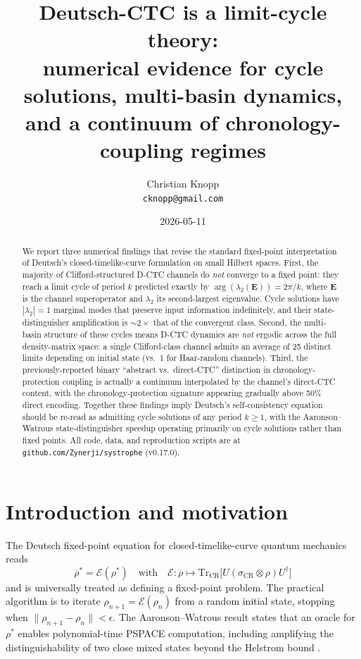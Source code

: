 \documentclass[11pt,a4paper]{article}
\title{\bfseries Deutsch-CTC is a limit-cycle theory: \\
numerical evidence for cycle solutions, multi-basin dynamics, \\
and a continuum of chronology-coupling regimes}
\author{Christian Knopp\\\texttt{cknopp@gmail.com}}
\date{2026-05-11}
\begin{document}
\maketitle

\begin{abstract}
We report three numerical findings that revise the standard
fixed-point interpretation of Deutsch's closed-timelike-curve
formulation \cite{Deutsch1991} on small Hilbert spaces. First, the
majority of Clifford-structured D-CTC channels do \emph{not}
converge to a fixed point: they reach a limit cycle of period $k$
predicted exactly by $\arg(\lambda_2(\mathbf{E})) = 2\pi/k$, where
$\mathbf{E}$ is the channel superoperator and $\lambda_2$ its
second-largest eigenvalue. Cycle solutions have $|\lambda_2| = 1$
marginal modes that preserve input information indefinitely, and
their state-distinguisher amplification is $\sim 2\times$ that of
the convergent class. Second, the multi-basin structure of these
cycles means D-CTC dynamics are \emph{not} ergodic across the full
density-matrix space: a single Clifford-class channel admits an
average of 25 distinct limits depending on initial state (vs.\ 1 for
Haar-random channels). Third, the previously-reported binary
``abstract vs.\ direct-CTC'' distinction in chronology-protection
coupling is actually a continuum interpolated by the channel's
direct-CTC content, with the chronology-protection signature
appearing gradually above 50\% direct encoding. Together these
findings imply Deutsch's self-consistency equation should be
re-read as admitting cycle solutions of any period $k \ge 1$, with
the Aaronson--Watrous \cite{AaronsonWatrous2009} state-distinguisher
speedup operating primarily on cycle solutions rather than fixed
points. All code, data, and reproduction scripts are at
\texttt{github.com/Zynerji/systrophe} (v0.17.0).
\end{abstract}

\section{Introduction and motivation}

The Deutsch fixed-point equation for closed-timelike-curve quantum
mechanics \cite{Deutsch1991} reads
\begin{equation}
\rho^* = \mathcal{E}(\rho^*) \quad\text{with}\quad
\mathcal{E}: \rho \mapsto \mathrm{Tr}_{\text{CR}}\!\big[ U(\sigma_{\text{CR}} \otimes \rho) U^\dagger \big]
\label{eq:dctc-fp}
\end{equation}
and is universally treated as defining a fixed-point problem. The
practical algorithm is to iterate $\rho_{n+1} = \mathcal{E}(\rho_n)$
from a random initial state, stopping when $\|\rho_{n+1} - \rho_n\| <
\epsilon$. The Aaronson--Watrous result \cite{AaronsonWatrous2009}
states that an oracle for $\rho^*$ enables polynomial-time PSPACE
computation, including amplifying the distinguishability of two
close mixed states beyond the Helstrom bound \cite{Helstrom1976}.
\end{document}
